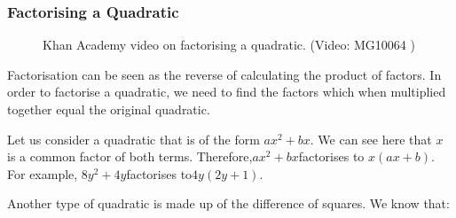             \subsubsection{ Factorising a Quadratic}
            \nopagebreak
      \label{m39394*eip-218}
    \setcounter{subfigure}{0}
	\begin{figure}[H] %
    \textnormal{Khan Academy video on factorising a quadratic.}\vspace{.1in} \nopagebreak
  \label{m39394*yt-media2}\label{m39394*yt-video2}
             { (Video:  MG10064 )}
      \vspace{2pt}
    \vspace{.1in}
 \end{figure}       \par \label{m39394*eip-411}Factorisation can be seen as the reverse of calculating the product of factors. In order to factorise a quadratic, we need to find the factors which when multiplied together equal the original quadratic.\par 
      \label{m39394*id275057}Let us consider a quadratic that is of the form $a{x}^{2}+bx$\hspace{1ex}. We can see here that $x$ is a common factor of both terms. Therefore,\hspace{1ex}$a{x}^{2}+bx$\hspace{1ex}factorises to $x\left(ax+b\right)$. For example, $8{y}^{2}+4y$\hspace{1ex}factorises to\hspace{1ex}$4y\left(2y+1\right)$.\par 
      \label{m39394*id275188}Another type of quadratic is made up of the difference of squares. We know that:\par 
      \label{m39394*id275192}\nopagebreak\noindent{}
